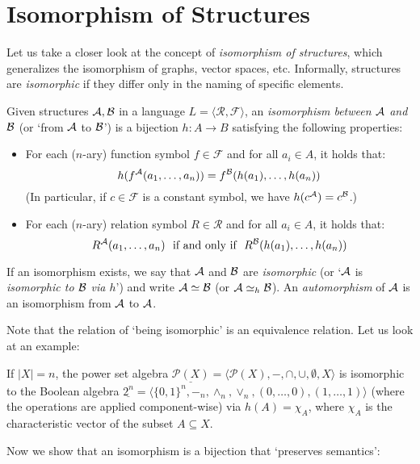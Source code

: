 \section{Isomorphism of Structures}\label{section:isomorphism-of-structures}

Let us take a closer look at the concept of \emph{isomorphism of structures}, which generalizes the isomorphism of graphs, vector spaces, etc. Informally, structures are \emph{isomorphic} if they differ only in the naming of specific elements.

\begin{definition}
Given structures $\mathcal{A}, \mathcal{B}$ in a language $L = \langle\mathcal{R}, \mathcal{F}\rangle$, an \emph{isomorphism between $\mathcal{A}$ and $\mathcal{B}$} (or `from $\mathcal{A}$ to $\mathcal{B}$') is a bijection $h\colon A \to B$ satisfying the following properties:
\begin{itemize}
    \item For each ($n$-ary) function symbol $f \in \mathcal{F}$ and for all $a_i \in A$, it holds that:
    $$
    h(f^{\mathcal{A}}(a_1, \dots, a_n)) = f^{\mathcal{B}}(h(a_1), \dots, h(a_n))
    $$
    (In particular, if $c \in \mathcal{F}$ is a constant symbol, we have $h(c^{\mathcal{A}}) = c^{\mathcal{B}}$.)
    \item For each ($n$-ary) relation symbol $R \in \mathcal{R}$ and for all $a_i \in A$, it holds that:
    $$
    R^\A(a_1, \dots, a_n)\ \text{ if and only if }\ R^\B(h(a_1), \dots, h(a_n))
    $$
\end{itemize}
If an isomorphism exists, we say that $\mathcal{A}$ and $\mathcal{B}$ are \emph{isomorphic} (or `$\mathcal{A}$ is \emph{isomorphic to $\mathcal{B}$ via $h$}') and write $\mathcal{A} \simeq \mathcal{B}$ (or $\mathcal{A} \simeq_h \mathcal{B}$). An \emph{automorphism} of $\mathcal{A}$ is an isomorphism from $\mathcal{A}$ to $\mathcal{A}$.
\end{definition}

Note that the relation of `being isomorphic' is an equivalence relation. Let us look at an example:

\begin{example}
    If $|X| = n$, the power set algebra $\underline{\mathcal{P}(X)} = \langle \mathcal{P}(X), -, \cap, \cup, \emptyset, X\rangle$ is isomorphic to the Boolean algebra $\underline{2^n} = \langle \{0,1\}^n, -_n, \land_n, \lor_n, (0, \dots, 0), (1, \dots, 1)\rangle$ (where the operations are applied component-wise) via $h(A) = \chi_A$, where $\chi_A$ is the characteristic vector of the subset $A \subseteq X$.
\end{example}

Now we show that an isomorphism is a bijection that `preserves semantics':

